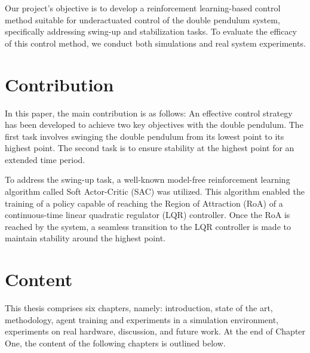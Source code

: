Our project's objective is to develop a reinforcement learning-based control method suitable for underactuated control of the double pendulum system, specifically addressing swing-up and stabilization tasks. To evaluate the efficacy of this control method, we conduct both simulations and real system experiments.


\section{Contribution}
In this paper, the main contribution is as follows: An effective control strategy has been developed to achieve two key objectives with the double pendulum. The first task involves swinging the double pendulum from its lowest point to its highest point. The second task is to ensure stability at the highest point for an extended time period.

To address the swing-up task, a well-known model-free reinforcement learning algorithm called Soft Actor-Critic (SAC) was utilized\cite{haarnoja2018soft}. This algorithm enabled the training of a policy capable of reaching the Region of Attraction (RoA) of a continuous-time linear quadratic regulator (LQR) controller\cite{lehtomaki1981robustness}. Once the RoA is reached by the system, a seamless transition to the LQR controller is made to maintain stability around the highest point.

\section{Content}
This thesis comprises six chapters, namely: introduction, state of the art, methodology, agent training and experiments in a simulation environment, experiments on real hardware, discussion, and future work. At the end of Chapter One, the content of the following chapters is outlined below.

